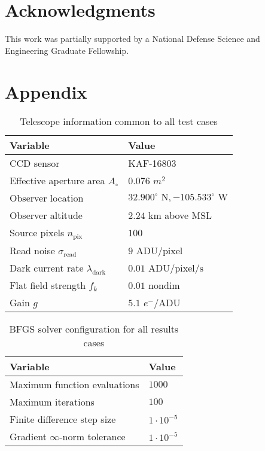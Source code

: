 \documentclass[a4paper,twocolumn]{spaceDebrisC} %
\begin{document}
\FloatBarrier
\section*{Acknowledgments}

This work was partially supported by a National Defense Science and Engineering Graduate Fellowship.

\FloatBarrier
\section*{Appendix}

\begin{table}[ht]
  \centering
  \caption{Telescope information common to all test cases}
  \vspace*{6pt}
  \begin{tabular}{|l|l|}
  \hline
  \textbf{Variable} & \textbf{Value} \\ \hline
  CCD sensor & KAF-16803 \\ \hline
  Effective aperture area $A_\circ$ & $0.076$ $m^2$ \\ \hline
  Observer location & $32.900^\circ \textrm{ N}, -105.533^\circ \textrm{ W}$ \\ \hline
  Observer altitude & $2.24$ km above MSL \\ \hline
  Source pixels $n_\text{pix}$ & $100$ \\ \hline
  Read noise $\sigma_\text{read}$ & $9$ $\text{ADU} / \text{pixel}$ \\ \hline
  Dark current rate $\lambda_\text{dark}$ & $0.01$ $\text{ADU} / \text{pixel} / \text{s}$ \\ \hline
  Flat field strength $f_k$ & $0.01$ nondim \\ \hline
  Gain $g$ & $5.1$ $e^- / \text{ADU}$ \\ \hline
  \end{tabular}
  \label{tb:tele_info}
 \end{table}

 \begin{table}[ht]
  \centering
  \caption{BFGS solver configuration for all results cases}
  \vspace*{6pt}
  \begin{tabular}{|l|l|}
  \hline
  \textbf{Variable} & \textbf{Value} \\ \hline
  Maximum function evaluations & $1000$ \\ \hline
  Maximum iterations & $100$ \\ \hline
  Finite difference step size & $1 \cdot 10^{-5}$ \\ \hline
  Gradient $\infty$-norm tolerance & $1 \cdot 10^{-5}$ \\ \hline
  \end{tabular}
  \label{tb:bfgs_info}
 \end{table}

\FloatBarrier
\clearpage

\end{document}
